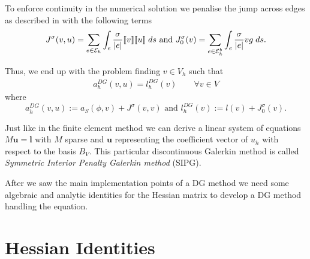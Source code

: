 
To enforce continuity in the numerical solution we penalise the jump across edges as described in  \cite[3.2.2.]{PPO+2000} with the following terms
\begin{align}
	J^\sigma(v, u) = \sum\limits_{e \in \mathcal{E}_h} \int_{e} {{ \frac \sigma {|e|} \llbracket v \rrbracket \llbracket u \rrbracket}\;ds}
		 \textnormal{ and } 	
		 J^\sigma_0(v) = \sum\limits_{e \in \mathcal{E}_h^b} \int_{e} {{\frac \sigma {|e|} v g}\;ds} . \label{eq: penalty term}
\end{align}

Thus, we end up with the problem finding $v \in V_h$ such that
\begin{align}
	a_h^{DG}(v, u) = l^{DG}_h (v) \qquad \forall v \in V \label{eq: DG system}
\end{align}
where
\[ 	
	a_h^{DG} (v, u) := a_S(\phi,v) + J^\sigma(v,v) \text{ and } l_h^{DG}(v) := l(v) + J^\sigma_0(v).
\]


Just like in the finite element method we can derive a linear system of equations $M \mathbf{u} = \mathbf{l}$ with $M$ sparse and $\mathbf{u}$ representing the coefficient vector of $u_h$ with respect to the basis $B_V$.
This particular discontinuous Galerkin method is called \emph{Symmetric Interior Penalty Galerkin method} (SIPG).





After we saw the main implementation points of a DG method we need some algebraic and analytic identities for the Hessian matrix to develop a DG method handling the \MA equation.
\section{Hessian Identities}

